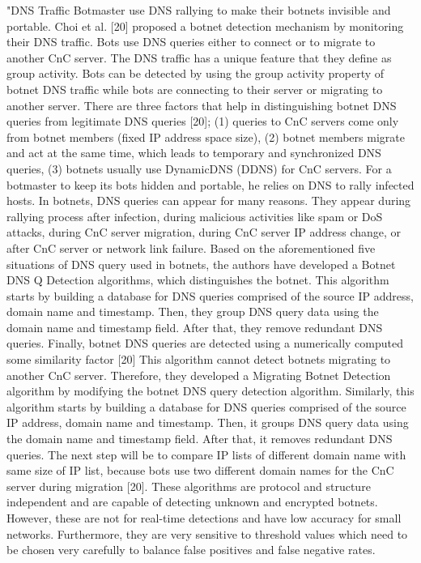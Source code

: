 \cite{detection5} 
"DNS Traffic Botmaster use DNS rallying to make their botnets invisible and portable. Choi et al. [20] proposed a botnet detection mechanism by monitoring their DNS traffic. Bots use DNS queries either to connect or to migrate to another CnC server. The DNS traffic has a unique feature that they define as group activity. Bots can be detected by using the group activity property of botnet DNS traffic while bots are connecting to their server or migrating to another server. There are three factors that help in distinguishing botnet DNS queries from legitimate DNS queries [20]; 
(1) queries to CnC servers come only from botnet members (fixed IP address space size), 
(2) botnet members migrate and act at the same time, which leads to temporary and synchronized DNS queries, 
(3) botnets usually use DynamicDNS (DDNS) for CnC servers. 
For a botmaster to keep its bots hidden and portable, he relies on DNS to rally infected hosts. In botnets, DNS queries can appear for many reasons. They appear during rallying process after infection, during malicious activities like spam or DoS attacks, during CnC server migration, during CnC server IP address change, or after CnC server or network link failure. Based on the aforementioned five situations of DNS query used in botnets, the authors have developed a Botnet DNS Q Detection algorithms, which distinguishes the botnet. This algorithm starts by building a database for DNS queries comprised of the source IP address, domain name and timestamp. Then, they group DNS query data using the domain name and timestamp field. After that, they remove redundant DNS queries. Finally, botnet
DNS queries are detected using a numerically computed some similarity factor [20] This algorithm cannot detect botnets migrating to another CnC server. Therefore, they developed a Migrating Botnet Detection algorithm by modifying the botnet DNS query detection algorithm. Similarly, this algorithm starts by building a database for DNS queries comprised of the source IP address, domain name and timestamp. Then, it groups DNS query data using the domain name and timestamp field.
After that, it removes redundant DNS queries. The next step will be to compare IP lists of different domain name with same size of IP list, because bots use two different domain names for the CnC server during migration [20]. These algorithms are protocol and structure independent and are capable of detecting unknown and encrypted botnets. However, these are not for real-time detections and have low accuracy for small networks. Furthermore, they are very sensitive to threshold values which need to be chosen very carefully to balance false positives and false negative rates.


